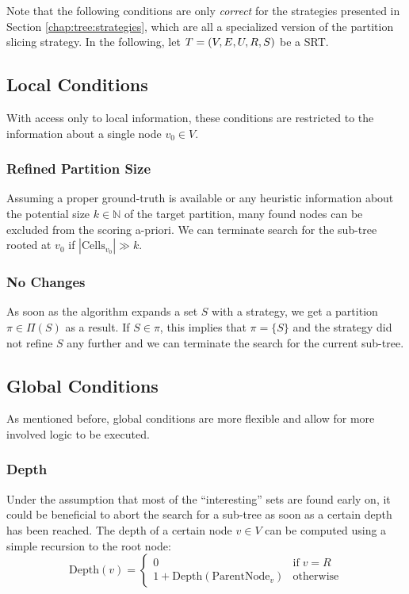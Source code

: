 		Note that the following conditions are only \textit{correct} for the strategies presented in Section \ref{chap:tree:strategies}, which are all a specialized version of the partition slicing strategy.
		In the following, let $T = (V, E, U, R, S)$ be a \ac{SRT}.

		\subsection{Local Conditions}

			With access only to local information, these conditions are restricted to the information about a single node $v_0 \in V$.

			\subsubsection{Refined Partition Size}

			Assuming a proper ground-truth is available or any heuristic information about the potential size $k \in \mathbb{N}$ of the target partition, many found nodes can be excluded from the scoring a-priori. 
			We can terminate search for the sub-tree rooted at $v_0$ if $| \mathrm{Cells}_{v_0} | \gg k$.

			\subsubsection{No Changes}

			As soon as the algorithm expands a set $S$ with a strategy, we get a partition $\pi \in \Pi(S)$ as a result.
			If $S \in \pi$, this implies that $\pi = \{ S \}$ and the strategy did not refine $S$ any further and we can terminate the search for the current sub-tree.

		\subsection{Global Conditions}

			As mentioned before, global conditions are more flexible and allow for more involved logic to be executed.

			\subsubsection{Depth}

				Under the assumption that most of the \enquote{interesting} sets are found early on, it could be beneficial to abort the search for a sub-tree as soon as a certain depth has been reached.
				The depth of a certain node $v \in V$ can be computed using a simple recursion to the root node:
				\begin{equation*}
					\mathrm{Depth}(v) = \begin{cases}
						0 & \text{if} \; v = R \\
						1 + \mathrm{Depth}(\mathrm{ParentNode}_v) & \mathrm{otherwise}
					\end{cases}
				\end{equation*}

